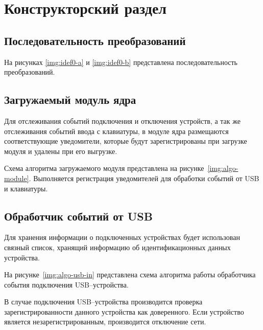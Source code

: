 \chapter{Конструкторский раздел}

\section{Последовательность преобразований}

На рисунках \ref{img:idef0-a} и \ref{img:idef0-b} представлена последовательность преобразований.



\section{Загружаемый модуль ядра}
\label{sect:lkm-design}

Для отслеживания событий подключения и отключения устройств, а так же отслеживания событий ввода с клавиатуры, в модуле ядра размещаются соответствующие уведомители, которые будут зарегистрированы при загрузке модуля и удалены при его выгрузке.

Схема алгоритма загружаемого модуля представлена на рисунке~\ref{img:algo-module}. Выполняется регистрация уведомителей для обработки событий от USB и клавиатуры.


\section{Обработчик событий от USB}
\label{sect:usb-handler-design}

Для хранения информации о подключенных устройствах будет использован связный список, хранящий информацию об идентификационных данных устройства.

На рисунке~\ref{img:algo-usb-in} представлена схема алгоритма работы обработчика события подключения USB--устройства.

В случае подключения USB--устройства производится проверка зарегистрированности данного устройства как доверенного. Если устройство является незарегистрированным, производится отключение сети.

\clearpage


